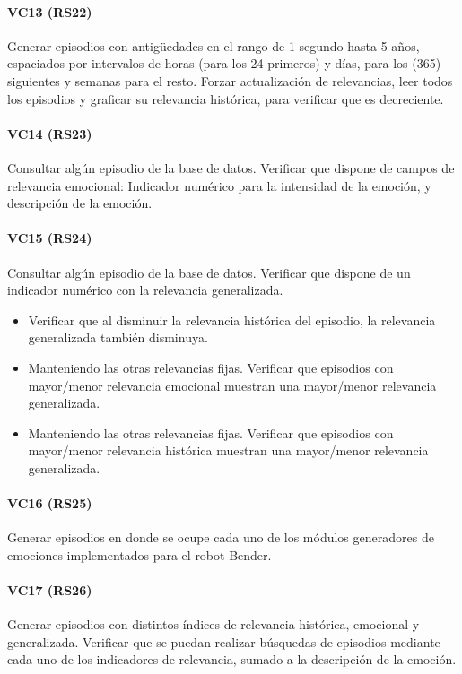\paragraph{VC13 (RS22)}
Generar episodios con antigüedades en el rango de 1 segundo hasta 5 años, espaciados por intervalos de horas (para los 24 primeros) y días, para los (365) siguientes y semanas para el resto. Forzar actualización de relevancias, leer todos los episodios y graficar su relevancia histórica, para verificar que es decreciente.

\paragraph{VC14 (RS23)}
Consultar algún episodio de la base de datos. Verificar que dispone de campos de relevancia emocional: Indicador numérico para la intensidad de la emoción, y descripción de la emoción.

\paragraph{VC15 (RS24)}
Consultar algún episodio de la base de datos. Verificar que dispone de un indicador numérico con la relevancia generalizada.
\begin{itemize}
\item Verificar que al disminuir la relevancia histórica del episodio, la relevancia generalizada también disminuya.
\item Manteniendo las otras relevancias fijas. Verificar que episodios con mayor/menor relevancia emocional muestran una mayor/menor relevancia generalizada.
\item Manteniendo las otras relevancias fijas. Verificar que episodios con mayor/menor relevancia histórica muestran una mayor/menor relevancia generalizada.
\end{itemize}

\paragraph{VC16 (RS25)}
Generar episodios en donde se ocupe cada uno de los módulos generadores de emociones implementados para el robot Bender.

\paragraph{VC17 (RS26)}
Generar episodios con distintos índices de relevancia histórica, emocional y generalizada. Verificar que se puedan realizar búsquedas de episodios mediante cada uno de los indicadores de relevancia, sumado a la descripción de la emoción.

